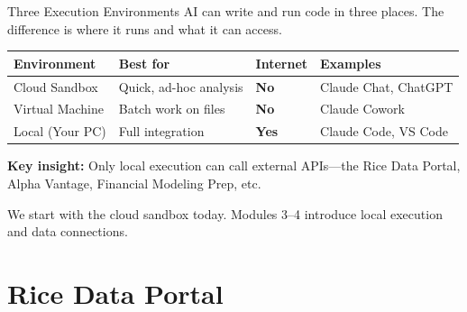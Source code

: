 \documentclass[aspectratio=169]{beamer}
\begin{document}
\begin{frame}{Three Execution Environments}
AI can write and run code in three places.  The difference is \alert{where} it runs and \alert{what} it can access.
\vspace{0.3cm}

\begin{center}\small
\begin{tabular}{@{} l l l l @{}}
\toprule
\textbf{Environment} & \textbf{Best for} & \textbf{Internet} & \textbf{Examples} \\
\midrule
Cloud Sandbox & Quick, ad-hoc analysis & {\color{alertorange}\textbf{No}} & Claude Chat, ChatGPT \\
Virtual Machine & Batch work on files & {\color{alertorange}\textbf{No}} & Claude Cowork \\
Local (Your PC) & Full integration & {\color{accentblue}\textbf{Yes}} & Claude Code, VS Code \\
\bottomrule
\end{tabular}
\end{center}

\vspace{0.3cm}
\textbf{Key insight:} Only \alert{local execution} can call external APIs---the Rice Data Portal, Alpha Vantage, Financial Modeling Prep, etc.

\vspace{0.2cm}
We start with the cloud sandbox today.  Modules 3--4 introduce local execution and data connections.
\end{frame}

\section{Rice Data Portal}
\end{document}
